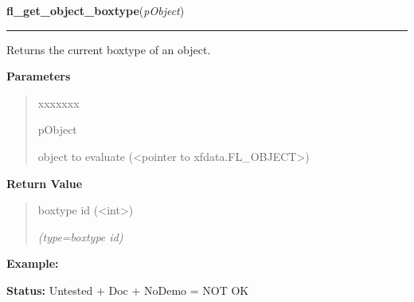 \hspace{.8\funcindent}\begin{boxedminipage}{\funcwidth}

    \raggedright \textbf{fl\_get\_object\_boxtype}(\textit{pObject})

    \vspace{-1.5ex}

    \rule{\textwidth}{0.5\fboxrule}
\setlength{\parskip}{2ex}
    Returns the current boxtype of an object.

\setlength{\parskip}{1ex}
      \textbf{Parameters}
      \vspace{-1ex}

      \begin{quote}
        \begin{Ventry}{xxxxxxx}

          \item[pObject]

          object to evaluate ({\textless}pointer to 
          xfdata.FL\_OBJECT{\textgreater})

        \end{Ventry}

      \end{quote}

      \textbf{Return Value}
    \vspace{-1ex}

      \begin{quote}
      boxtype id ({\textless}int{\textgreater})

      {\it (type=boxtype id)}

      \end{quote}

\textbf{Example:} 

\textbf{Status:} Untested + Doc + NoDemo = NOT OK



    \end{boxedminipage}

    \label{xformslib:library:fl_set_object_bw}

    \vspace{0.5ex}

